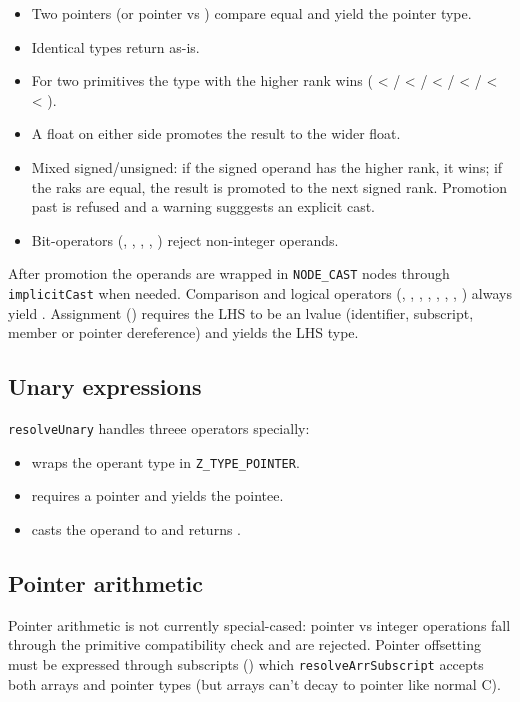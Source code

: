 \begin{itemize}
    \item Two pointers (or pointer vs ) compare equal and yield the pointer type.
    \item Identical types return as-is.
    \item For two primitives the type with the higher rank wins ( < / < / < / < / <  < ).
    \item A float on either side promotes the result to the wider float.
    \item Mixed signed/unsigned: if the signed operand has the higher rank, it wins; if the raks are equal, the result is promoted to the next signed rank. Promotion past  is refused and a warning sugggests an explicit cast.
    \item Bit-operators (\zn{&}, \zn{|}, \zn{^}, \zn{<<}, \zn{>>}) reject non-integer operands.
\end{itemize}

After promotion the operands are wrapped in \texttt{NODE\_CAST} nodes through \texttt{implicitCast} when needed.
Comparison and logical operators (\zn{==}, \zn{!=}, \zn{<}, \zn{>}, \zn{<=}, \zn{>=}, , ) always yield . Assignment (\zn{=}) requires the LHS to be an lvalue (identifier, subscript, member or pointer dereference) and yields the LHS type.

\subsection{Unary expressions}
\texttt{resolveUnary} handles threee operators specially:
\begin{itemize}
    \item {} wraps the operant type in \texttt{Z\_TYPE\_POINTER}.
    \item {} requires a pointer and yields the pointee.
    \item {} casts the operand to  and returns .
\end{itemize}

\subsection{Pointer arithmetic}
Pointer arithmetic is not currently special-cased: pointer vs integer operations fall through the primitive compatibility check and are rejected. Pointer offsetting must be expressed through subscripts () which \texttt{resolveArrSubscript} accepts both arrays and pointer types (but arrays can't decay to pointer like normal C).

